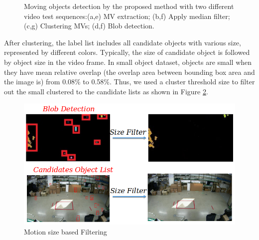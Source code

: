 \begin{figure}
{}
\caption{Moving objects detection by the proposed method with two different video test sequences:(a,e) MV extraction; (b,f) Apply median filter; (c,g) Clustering MVs; (d,f) Blob detection.}
\label{fig:mvanalysis}
\end{figure}
After clustering, the label list includes all candidate objects with various size, represented by different colors. Typically, the size of candidate object is followed by object size in the video frame. In small object dataset, objects are small when they have mean relative overlap (the overlap area between bounding box area and the image is) from 0.08\% to 0.58\%. Thus, we used a cluster threshold size to filter out the small clustered to the candidate lists as shown in Figure \ref{fig:filter}.\\
\begin{figure}
\centering
 \includegraphics[width=1.0\linewidth]{Figures/filter.png}
 \caption{Motion size based Filtering}
 \label{fig:filter}
\end{figure}
